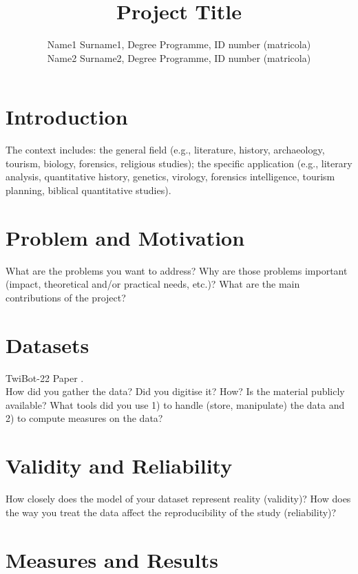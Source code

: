 \documentclass[12pt, a4paper]{article}
\author{Name1 Surname1, Degree Programme, ID number (matricola)
\\Name2 Surname2, Degree Programme, ID number (matricola)}
\date{}
\title{Project Title}
\begin{document}
\maketitle

\section{Introduction}
\label{introduction}

The context includes: the general field (e.g., literature, history,
archaeology, tourism, biology, forensics, religious studies); the
specific application (e.g., literary analysis, quantitative history,
genetics, virology, forensics intelligence, tourism planning, biblical
quantitative studies).

\section{Problem and Motivation}
\label{problem-and-motivation}

What are the problems you want to address? Why are those problems
important (impact, theoretical and/or practical needs, etc.)? What are
the main contributions of the project?

\section{Datasets}
\label{datasets}

TwiBot-22 Paper \cite{twibot22}.\\

How did you gather the data? Did you digitise it? How? Is the material
publicly available? What tools did you use 1) to handle (store,
manipulate) the data and 2) to compute measures on the data?

\section{Validity and Reliability}
\label{validity-and-reliability-not-needed-for-the-project-proposal}

How closely does the model of your dataset represent reality (validity)?
How does the way you treat the data affect the reproducibility of the study (reliability)?

\section{Measures and Results}
\label{measures}
\end{document}
